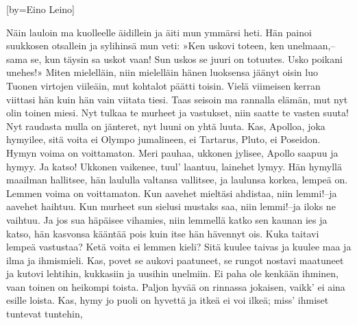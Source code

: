 \endsong




[by=Eino Leino]

\beginverse
Näin lauloin ma kuolleelle äidillein
ja äiti mun ymmärsi heti.
Hän painoi suukkosen otsallein
ja sylihinsä mun veti:
»Ken uskovi toteen, ken unelmaan,--
sama se, kun täysin sa uskot vaan!
Sun uskos se juuri on totuutes.
Usko poikani unehes!»
\endverse
\beginverse
Miten mielelläin, niin mielelläin
hänen luoksensa jäänyt oisin
luo Tuonen virtojen viileäin,
mut kohtalot päätti toisin.
Vielä viimeisen kerran viittasi hän
kuin hän vain viitata tiesi.
Taas seisoin ma rannalla elämän,
mut nyt olin toinen miesi.
\endverse
\beginverse
Nyt tulkaa te murheet ja vastukset,
niin saatte te vasten suuta!
Nyt raudasta mulla on jänteret,
nyt luuni on yhtä luuta.
Kas, Apolloa, joka hymyilee,
sitä voita ei Olympo jumalineen,
ei Tartarus, Pluto, ei Poseidon.
Hymyn voima on voittamaton.
\endverse
\beginverse
Meri pauhaa, ukkonen jylisee,
Apollo saapuu ja hymyy.
Ja katso! Ukkonen vaikenee,
tuul' laantuu, lainehet lymyy.
Hän hymyllä maailman hallitsee,
hän laululla valtansa vallitsee,
ja laulunsa korkea, lempeä on.
Lemmen voima on voittamaton.
\endverse
\beginverse
Kun aavehet mieltäsi ahdistaa,
niin lemmi!--ja aavehet haihtuu.
Kun murheet sun sielusi mustaks saa,
niin lemmi!--ja iloks ne vaihtuu.
Ja jos sua häpäisee vihamies,
niin lemmellä katko sen kaunan ies
ja katso, hän kasvonsa kääntää pois
kuin itse hän hävennyt ois.
\endverse
\beginverse
Kuka taitavi lempeä vastustaa?
Ketä voita ei lemmen kieli?
Sitä kuulee taivas ja kuulee maa
ja ilma ja ihmismieli.
Kas, povet se aukovi paatuneet,
se rungot nostavi maatuneet
ja kutovi lehtihin, kukkasiin
ja uusihin unelmiin.
\endverse
\beginverse
Ei paha ole kenkään ihminen,
vaan toinen on heikompi toista.
Paljon hyvää on rinnassa jokaisen,
vaikk' ei aina esille loista.
Kas, hymy jo puoli on hyvettä
ja itkeä ei voi ilkeä;
miss' ihmiset tuntevat tuntehin,
\endverse

\endsong